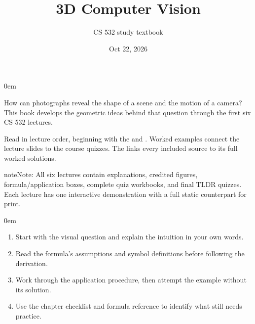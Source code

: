 \documentclass[letterpaper,11pt,english,openany,oneside]{jupyterBook}
\title{3D Computer Vision}
\date{Oct 22, 2026}
\author{CS 532 study textbook}
\begin{document}
\pagestyle{empty}
\sphinxmaketitle
\pagestyle{plain}
\sphinxtableofcontents
\pagestyle{normal}
\label{\detokenize{intro::doc}}


\begin{DUlineblock}{0em}
\item[] 
\end{DUlineblock}

\sphinxAtStartPar
How can photographs reveal the shape of a scene and the motion of a camera? This book develops the geometric ideas behind that question through the first six CS 532 lectures.

\sphinxAtStartPar
Read in lecture order, beginning with the {\hyperref[\detokenize{foundations/notation::doc}]{}} and {\hyperref[\detokenize{foundations/prerequisites::doc}]{}}. Worked examples connect the lecture slides to the course quizzes. The {\hyperref[\detokenize{reference/quiz-index::doc}]{}} links every included source to its full worked solutions.

\begin{sphinxadmonition}{note}{Note:}
\sphinxAtStartPar
All six lectures contain explanations, credited figures, formula/application boxes, complete quiz workbooks, and final TLDR quizzes. Each lecture has one interactive demonstration with a full static counterpart for print.
\end{sphinxadmonition}

\begin{DUlineblock}{0em}
\item[] 
\end{DUlineblock}
\begin{enumerate}
%
\item {}
\sphinxAtStartPar
Start with the visual question and explain the intuition in your own words.

\item {}
\sphinxAtStartPar
Read the formula’s assumptions and symbol definitions before following the derivation.

\item {}
\sphinxAtStartPar
Work through the application procedure, then attempt the example without its solution.

\item {}
\sphinxAtStartPar
Use the chapter checklist and formula reference to identify what still needs practice.

\end{enumerate}
\end{document}
